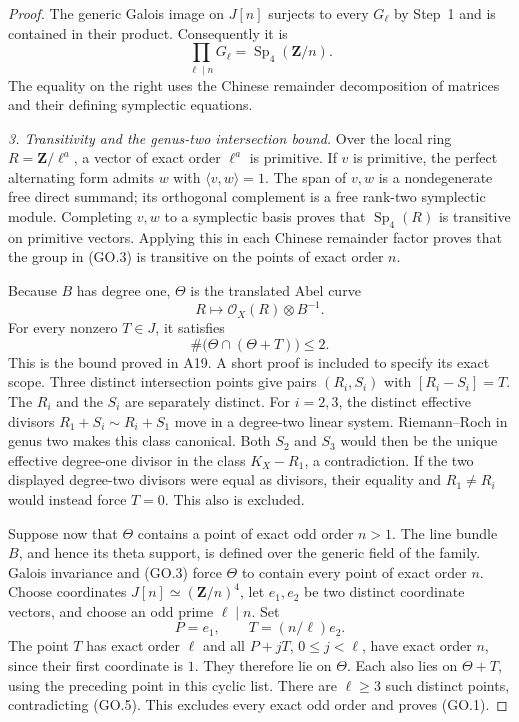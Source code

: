\documentclass[11pt,a4paper]{article}
\begin{document}
\begin{proof}
The generic Galois image on $J[n]$ surjects to every
$G_\ell$ by Step~1 and is contained in their product.
Consequently it is
\[
            \prod_{\ell\mid n}G_\ell
                  =\operatorname{Sp}_4(\mathbf Z/n).         \tag{GO.3}
\]
The equality on the right uses the Chinese remainder
decomposition of matrices and their defining symplectic
equations.

\emph{3. Transitivity and the genus-two intersection bound.}
Over the local ring $R=\mathbf Z/\ell^a$, a vector of exact
order $\ell^a$ is primitive.  If $v$ is primitive, the
perfect alternating form admits $w$ with
$\langle v,w\rangle=1$.  The span of $v,w$ is a
nondegenerate free direct summand; its orthogonal
complement is a free rank-two symplectic module.
Completing $v,w$ to a symplectic basis proves that
$\operatorname{Sp}_4(R)$ is transitive on primitive
vectors.  Applying this in each Chinese remainder factor
proves that the group in (GO.3) is transitive on the
points of exact order $n$.

Because $B$ has degree one, $\Theta$ is the translated
Abel curve
\[
                 R\longmapsto\mathcal O_X(R)\otimes B^{-1}.
                                                               \tag{GO.4}
\]
For every nonzero $T\in J$, it satisfies
\[
                   \#\bigl(\Theta\cap(\Theta+T)\bigr)\le2.
                                                               \tag{GO.5}
\]
This is the bound proved in A19.  A short proof is included
to specify its exact scope.  Three distinct intersection
points give pairs $(R_i,S_i)$ with $[R_i-S_i]=T$.
The $R_i$ and the $S_i$ are separately distinct.  For
$i=2,3$, the distinct effective divisors
$R_1+S_i\sim R_i+S_1$ move in a degree-two linear system.
Riemann--Roch in genus two makes this class canonical.
Both $S_2$ and $S_3$ would then be the unique effective
degree-one divisor in the class $K_X-R_1$, a contradiction.
If the two displayed degree-two divisors were equal as
divisors, their equality and $R_1\ne R_i$ would instead
force $T=0$.  This also is excluded.

Suppose now that $\Theta$ contains a point of exact odd
order $n>1$.  The line bundle $B$, and hence its theta
support, is defined over the generic field of the family.
Galois invariance and (GO.3) force $\Theta$ to contain
every point of exact order $n$.  Choose coordinates
$J[n]\simeq(\mathbf Z/n)^4$, let $e_1,e_2$ be two
distinct coordinate vectors, and choose an odd prime
$\ell\mid n$.  Set
\[
                   P=e_1,\qquad T=(n/\ell)e_2.
\]
The point $T$ has exact order $\ell$ and all
$P+jT$, $0\le j<\ell$, have exact order $n$, since their
first coordinate is $1$.  They therefore lie on $\Theta$.
Each also lies on $\Theta+T$, using the preceding point
in this cyclic list.  There are $\ell\ge3$ such distinct
points, contradicting (GO.5).  This excludes every exact
odd order and proves (GO.1).


\end{proof}
\end{document}
